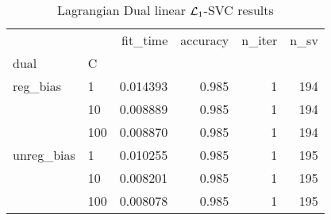 \begin{table}[H]
\centering
\caption{Lagrangian Dual linear $\protect \mathcal{L}_1$-SVC results}
\label{linear_lagrangian_dual_l1_svc_cv_results}
\begin{tabular}{llrrrr}
\toprule
           &     &  fit\_time &  accuracy &  n\_iter &  n\_sv \\
dual & C &           &           &         &       \\
\midrule
reg\_bias & 1   &  0.014393 &     0.985 &       1 &   194 \\
           & 10  &  0.008889 &     0.985 &       1 &   194 \\
           & 100 &  0.008870 &     0.985 &       1 &   194 \\
unreg\_bias & 1   &  0.010255 &     0.985 &       1 &   195 \\
           & 10  &  0.008201 &     0.985 &       1 &   195 \\
           & 100 &  0.008078 &     0.985 &       1 &   195 \\
\bottomrule
\end{tabular}
\end{table}
